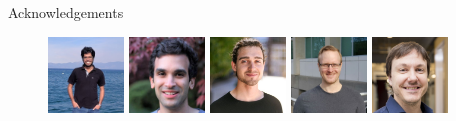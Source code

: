 \documentclass[mathserif,notheorems, hyperref={colorlinks, urlcolor=blue, linkcolor=blue}]{beamer}
\begin{document}


    \begin{frame}{Acknowledgements}
     
        \begin{figure}
            \centering
            \includegraphics[width=0.18\textwidth]{collaborators/sharan}
            \includegraphics[width=0.18\textwidth]{collaborators/issam}
            \includegraphics[width=0.18\textwidth]{collaborators/gauthier}
            \includegraphics[width=0.18\textwidth]{collaborators/mark}
            \includegraphics[width=0.18\textwidth]{collaborators/simon}

            \vspace{0.4ex}%


\end{figure}
\end{frame}
\end{document}
